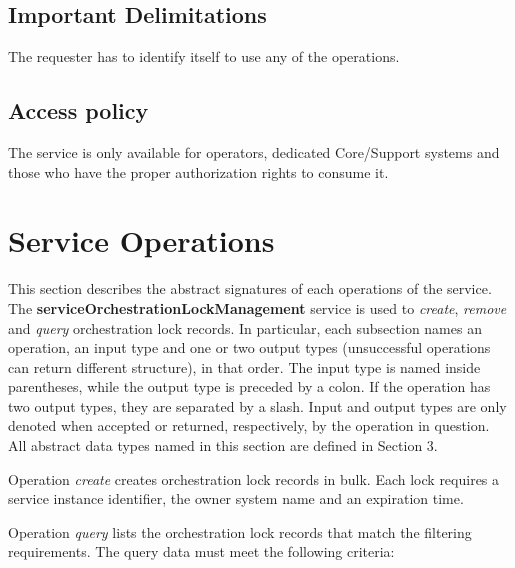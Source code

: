 \documentclass[a4paper]{arrowhead}
\begin{document}
\subsection{Important Delimitations}
\label{sec:delimitations}

The requester has to identify itself to use any of the operations. 

\subsection{Access policy}
\label{sec:accesspolicy}

The service is only available for operators, dedicated Core/Support systems and those who have the proper authorization rights to consume it.

\newpage

\section{Service Operations}
\label{sec:functions}

This section describes the abstract signatures of each operations of the service. The \textbf{serviceOrchestrationLockManagement} service is used to \textit{create}, \textit{remove} and \textit{query} orchestration lock records.
In particular, each subsection names an operation, an input type and one or two output types (unsuccessful operations can return different structure), in that order.
The input type is named inside parentheses, while the output type is preceded by a colon. If the operation has two output types, they are separated by a slash.
Input and output types are only denoted when accepted or returned, respectively, by the operation in question. All abstract data types named in this section are defined in Section 3.

{}

Operation \textit{create} creates orchestration lock records in bulk. Each lock requires a service instance identifier, the owner system name and an expiration time. 


Operation \textit{query} lists the orchestration lock records that match the filtering requirements. The query data must meet the following criteria:
\end{document}
